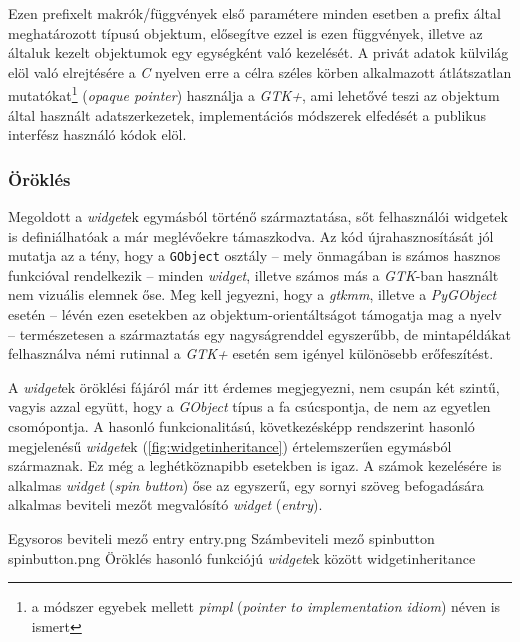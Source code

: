 Ezen prefixelt makrók/függvények első paramétere minden esetben a prefix által meghatározott típusú objektum, elősegítve ezzel is ezen függvények, illetve az általuk kezelt objektumok egy egységként való kezelését. A privát adatok külvilág elöl való elrejtésére a \textit{C} nyelven erre a célra széles körben alkalmazott átlátszatlan mutatókat\footnote{a módszer egyebek mellett \textit{pimpl} (\textit{pointer to implementation idiom}) néven is ismert} (\textit{opaque pointer}) használja a \textit{GTK+}, ami lehetővé teszi az objektum által használt adatszerkezetek, implementációs módszerek elfedését a publikus interfész használó kódok elöl.

\subsubsection{Öröklés}

Megoldott a \textit{widget}ek egymásból történő származtatása, sőt felhasználói widgetek is definiálhatóak a már meglévőekre támaszkodva. Az kód újrahasznosítását jól mutatja az a tény, hogy a \texttt{GObject} osztály -- mely önmagában is számos hasznos funkcióval rendelkezik -- minden \textit{widget}, illetve számos  más a \textit{GTK}-ban használt nem vizuális elemnek őse. Meg kell jegyezni, hogy a \textit{gtkmm}, illetve a \textit{PyGObject} esetén -- lévén ezen esetekben az objektum-orientáltságot támogatja mag a nyelv -- természetesen a származtatás egy nagyságrenddel egyszerűbb, de mintapéldákat felhasználva némi rutinnal a \textit{GTK+} esetén sem igényel különösebb erőfeszítést.

A \textit{widget}ek öröklési fájáról már itt érdemes megjegyezni, nem csupán két szintű, vagyis azzal együtt, hogy a \textit{GObject} típus a fa csúcspontja, de nem az egyetlen csomópontja. A hasonló funkcionalitású, következésképp rendszerint hasonló megjelenésű \textit{widget}ek (\ref{fig:widgetinheritance}) értelemszerűen egymásból származnak. Ez még a leghétköznapibb esetekben is igaz. A számok kezelésére is alkalmas \textit{widget} (\textit{spin button}) őse az egyszerű, egy sornyi szöveg befogadására alkalmas beviteli mezőt megvalósító \textit{widget} (\textit{entry}).

{Egysoros beviteli mező}
{entry}
{entry.png}
{Számbeviteli mező}
{spinbutton}
{spinbutton.png}
{Öröklés hasonló funkciójú \textit{widget}ek között}
{widgetinheritance}

